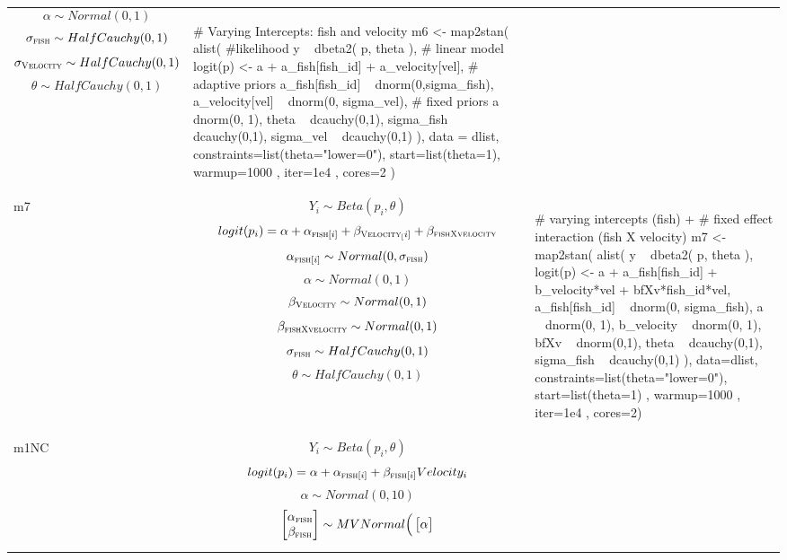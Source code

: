 \begin{longtable}{ l | p{}| p{} }
$$ \alpha \sim Normal(0, 1) $$
$$ \sigma_{\textsc{fish}} \sim HalfCauchy(0,1) $$
$$ \sigma_{\textsc{Velocity}} \sim HalfCauchy(0, 1) $$
$$ \theta \sim HalfCauchy(0, 1) $$
&
{\begin{mylist}
# Varying Intercepts: fish and velocity
m6 <- map2stan(
  alist(
    #likelihood
    y ~ dbeta2( p, theta ),
    # linear model
    logit(p) <- a + a_fish[fish_id] + a_velocity[vel],
    # adaptive priors
    a_fish[fish_id] ~ dnorm(0,sigma_fish),
    a_velocity[vel] ~ dnorm(0, sigma_vel),
    # fixed priors
    a ~ dnorm(0, 1),
    theta ~ dcauchy(0,1),
    sigma_fish ~ dcauchy(0,1),
    sigma_vel ~ dcauchy(0,1)
  ),
  data = dlist,
  constraints=list(theta="lower=0"),
  start=list(theta=1), warmup=1000 , iter=1e4 , cores=2 )  \end{mylist}} 
\\ %
m7 &
$$ Y_i \sim Beta(p_i, \theta) $$
$$ logit(p_i) = \alpha + \alpha_{\textsc{fish}[i]} + \beta_{\textsc{Velocity}_[i]} + \beta_{\textsc{fishXvelocity}}$$
$$ \alpha_{\textsc{fish}[i]} \sim Normal(0,\sigma_{\textsc{fish}}) $$
$$ \alpha \sim Normal(0, 1) $$
$$ \beta_{\textsc{Velocity}}  \sim Normal(0,1) $$
$$ \beta_{\textsc{fishXvelocity}}  \sim Normal(0,1) $$
$$ \sigma_{\textsc{fish}} \sim HalfCauchy(0,1) $$
$$ \theta \sim HalfCauchy(0, 1) $$
&
{\begin{mylist}
# varying intercepts (fish) + 
# fixed effect interaction (fish X velocity)
m7 <- map2stan(
  alist(
    y ~ dbeta2( p, theta ),
    logit(p) <- a + a_fish[fish_id] +  b_velocity*vel + 
    bfXv*fish_id*vel, 
    a_fish[fish_id] ~ dnorm(0, sigma_fish),
    a ~ dnorm(0, 1),
    b_velocity ~ dnorm(0, 1),
    bfXv ~ dnorm(0,1),
    theta ~ dcauchy(0,1),
    sigma_fish ~ dcauchy(0,1)
  ),
  data=dlist,
  constraints=list(theta="lower=0"),
  start=list(theta=1) , warmup=1000 , iter=1e4 , cores=2)
   \end{mylist}}
\\ %
m1NC &
$$ Y_i \sim Beta(p_i, \theta) $$
\small $$ logit(p_i) = \alpha + \alpha_{\textsc{fish}[i]} + \beta_{\textsc{fish}[i]}Velocity_i$$
$$ \alpha \sim Normal(0,10) $$
$$
\begin{bmatrix}
\alpha_{\textsc{fish}} \\
\beta_{\textsc{fish}}
\end{bmatrix} \sim MVNormal \Big(
\begin{bmatrix}
\alpha \\

\end{bmatrix}$$
\end{longtable}
